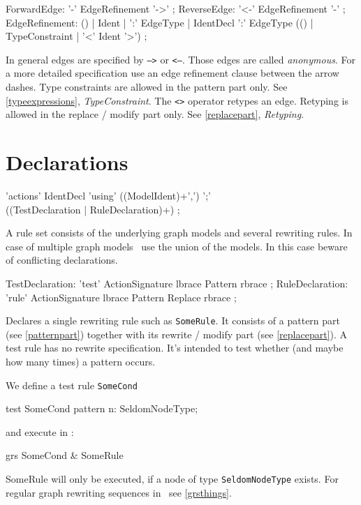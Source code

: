 \begin{rail}
  ForwardEdge: '-' EdgeRefinement '->' ;
  ReverseEdge: '<-' EdgeRefinement '-' ;  
  EdgeRefinement: () | Ident | ':' EdgeType | IdentDecl ':' EdgeType (() | TypeConstraint | '<' Ident '>') ;
\end{rail}
In general edges are specified by \texttt{-->} or \texttt{<--}. Those edges are called \emph{anonymous}. For a more detailed specification use an edge refinement clause between the arrow dashes. Type constraints are allowed in the pattern part only. See \ref{typeexpressions}, \emph{TypeConstraint}. The \texttt{<>} operator retypes an edge. Retyping is allowed in the replace / modify part only. See \ref{replacepart}, \emph{Retyping}.

\section{Declarations}
\label{ruledecls}
\begin{rail}
  'actions' IdentDecl 'using' ((ModelIdent)+',') ';' \\ ((TestDeclaration | RuleDeclaration)+) ;
\end{rail}
A rule set consists of the underlying graph models and several rewriting rules. In case of multiple graph models \GrG\ use the union of the models. In this case beware of conflicting declarations.

\begin{rail}
  TestDeclaration: 'test' ActionSignature lbrace Pattern rbrace ;
  RuleDeclaration: 'rule' ActionSignature lbrace Pattern Replace rbrace ;
\end{rail}
Declares a single rewriting rule such as \texttt{SomeRule}. It consists of a pattern part (see \ref{patternpart}) together with its rewrite / modify part (see \ref{replacepart}). A test rule has no rewrite specification. It's intended to test whether (and maybe how many times) a pattern occurs.
\begin{example}
We define a test rule \texttt{SomeCond}
\begin{grgen}
test SomeCond {
  pattern {
    n: SeldomNodeType;
  }
}
\end{grgen}
and execute in \GrShell:
\begin{grshell}
  grs SomeCond & SomeRule
\end{grshell}
SomeRule will only be executed, if a node of type \texttt{SeldomNodeType} exists. For regular graph rewriting sequences in \GrShell\ see \ref{grsthings}.
\end{example}

